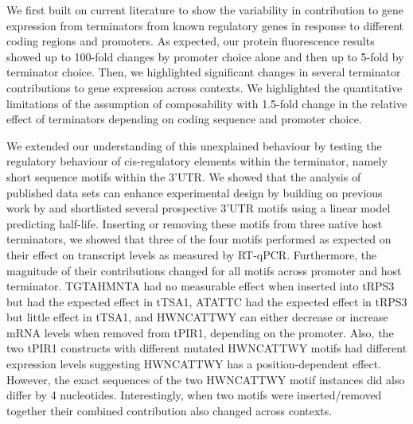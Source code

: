 \documentclass[../main.tex]{subfiles}
\begin{document}
We first built on current literature to show the variability in contribution to gene expression from terminators from known regulatory genes in response to different coding regions and promoters. 
As expected, our protein fluorescence results showed up to 100-fold changes by promoter choice alone and then up to 5-fold by terminator choice.
Then, we highlighted significant changes in several terminator contributions to gene expression across contexts. 
We highlighted the quantitative limitations of the assumption of composability with 1.5-fold change in the relative effect of terminators depending on coding sequence and promoter choice.

We extended our understanding of this unexplained behaviour by testing the regulatory behaviour of cis-regulatory elements within the terminator, namely short sequence motifs within the 3'UTR.
We showed that the analysis of published data sets can enhance experimental design by building on previous work by \cite{Cheng2017} and shortlisted several prospective 3'UTR motifs using a linear model predicting half-life.
Inserting or removing these motifs from three native host terminators, we showed that three of the four motifs performed as expected on their effect on transcript levels as measured by  RT-qPCR.
Furthermore, the magnitude of their contributions changed for all motifs across promoter and host terminator. 
TGTAHMNTA had no measurable effect when inserted into tRPS3 but had the expected effect in tTSA1, ATATTC had the expected effect in tRPS3 but little effect in tTSA1, and HWNCATTWY can either decrease or increase mRNA levels when removed from tPIR1, depending on the promoter.
Also, the two tPIR1 constructs with different mutated HWNCATTWY motifs had different expression levels suggesting HWNCATTWY has a position-dependent effect. 
However, the exact sequences of the two HWNCATTWY motif instances did also differ by 4 nucleotides.
Interestingly, when two motifs were inserted/removed together their combined contribution also changed across contexts.
\end{document}
